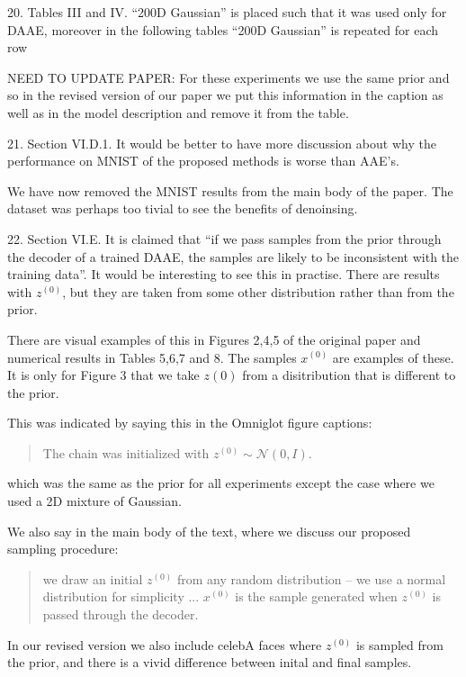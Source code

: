 \documentclass{article}
\begin{document}
{\color{blue}
20. Tables III and IV. ``200D Gaussian'' is placed such that it was used only for DAAE, moreover in the following tables ``200D Gaussian'' is repeated for each row
}

{\color{red} NEED TO UPDATE PAPER: For these experiments we use the same prior and so in the revised version of our paper we put this information in the caption as well as in the model description and remove it from the table.}


21. Section VI.D.1. It would be better to have more discussion about why the performance on MNIST of the proposed methods is worse than AAE's.

{\color{red} We have now removed the MNIST results from the main body of the paper. The dataset was perhaps too tivial to see the benefits of denoinsing.}

22. Section VI.E. It is claimed that ``if we pass samples from the prior through the decoder of a trained DAAE, the samples are likely to be inconsistent with the training data''. It would be interesting to see this in practise. There are results with $z^{(0)}$, but they are taken from some other distribution rather than from the prior.

{\color{red}
There are visual examples of this in Figures 2,4,5 of the original paper and numerical results in Tables 5,6,7 and 8. The samples $x^{(0)}$ are examples of these. It is only for Figure 3 that we take $z{(0)}$ from a disitribution that is different to the prior.

This was indicated by saying this in the Omniglot figure captions:

\begin{quote}
The chain was initialized with $z^{(0)} \sim \mathcal{N}(0,I)$.
\end{quote}
which was the same as the prior for all experiments except the case where we used a 2D mixture of Gaussian.

We also say in the main body of the text, where we discuss our proposed sampling procedure:
\begin{quote}
we draw an initial $z^{(0)}$ from any random distribution – we use a normal distribution for simplicity ... $x^{(0)}$ is the sample generated when $z^{(0)}$ is passed through the decoder.
\end{quote}

In our revised version we also include celebA faces where $z^{(0)}$ is sampled from the prior, and there is a vivid difference between inital and final samples.
}
\end{document}
